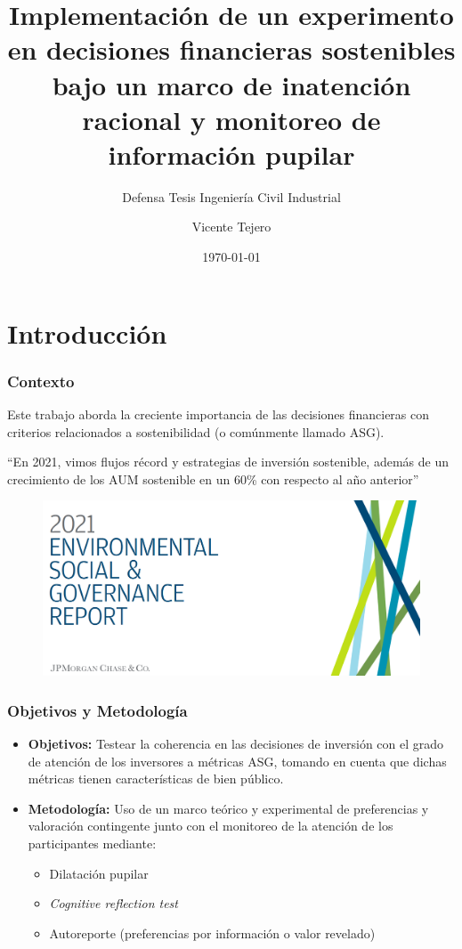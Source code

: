 \documentclass{beamer}
\title{Implementación  de un experimento en decisiones financieras sostenibles bajo un marco de inatención racional y monitoreo de información pupilar}
\subtitle{Defensa Tesis Ingeniería Civil Industrial}
\author{Vicente Tejero}
\institute[Universidad de los Andes]
{
    Universidad de los Andes \\
    \medskip
    \textit{Profesor guía: Sebastián Cea}
}
\date{\today}
\begin{document}
\begin{frame}
    \titlepage
\end{frame}

\begin{frame}
    \tableofcontents
\end{frame}

\section{Introducción}
\begin{frame}
    \frametitle{Contexto}
Este trabajo aborda la creciente importancia de las decisiones financieras con criterios relacionados a sostenibilidad (o comúnmente llamado ASG).

\begin{center}
    ``En 2021, vimos flujos récord y estrategias de inversión sostenible, además de un crecimiento de los AUM sostenible en un 60\% con respecto al año anterior''
        \cite{jpmorgan_chase_2021_2021}
\end{center}
    \begin{figure}
        \centering
        \includegraphics[width=0.5\linewidth]{JPMorgaReport2021.png}
        \label{fig:jpmcreport2021}
    \end{figure}
\end{frame}

\begin{frame}
    \frametitle{Objetivos y Metodología}
    \begin{itemize}
        \item \textbf{Objetivos:} Testear la coherencia en las decisiones de inversión con el grado de atención de los inversores a métricas ASG, tomando en cuenta que dichas métricas tienen características de bien público.
        \item \textbf{Metodología:} Uso de un marco teórico y experimental de preferencias y valoración contingente junto con el monitoreo de la atención de los participantes mediante:
        \begin{itemize}
            \item Dilatación pupilar 
            \item \emph{Cognitive reflection test}
            \item Autoreporte (preferencias por información o valor revelado)
        \end{itemize}
    \end{itemize}
\end{frame}
\end{document}

